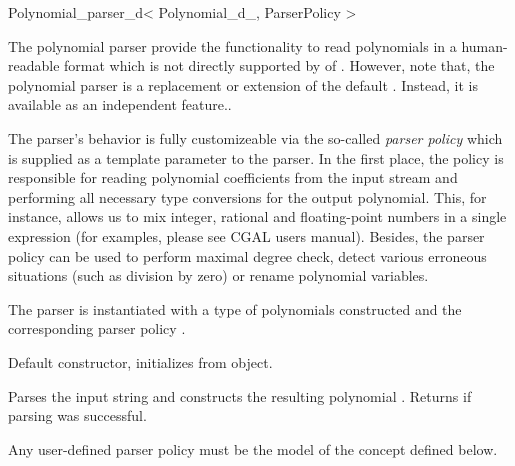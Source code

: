 % 
% 

\begin{ccRefClass}{Polynomial_parser_d< Polynomial_d_, ParserPolicy >}
\def\ccTagOperatorLayout{\ccFalse}


\ccDefinition

The polynomial parser provide the functionality to read polynomials in a human-readable format which
is not directly supported by  of . However, note that,
the polynomial parser is  a replacement or extension of the default . Instead,
it is available as an independent feature..

The parser's behavior is fully customizeable via the so-called {\em parser policy} 
which is supplied as a template parameter to the parser. 
In the first place, the policy is responsible for reading polynomial 
coefficients from the input stream and performing all necessary type conversions
for the output polynomial. This, for instance, allows us to mix integer, rational and 
floating-point numbers in a single expression (for examples, please see CGAL users manual).
Besides, the parser policy can be used to perform maximal degree check,
detect various erroneous situations (such as division by zero) 
or rename polynomial variables.

\ccParameters
The parser is instantiated with a type 
of polynomials constructed  and the corresponding parser policy . 


\ccCreation
{}

% 

{Default constructor, initializes from  object.}

\ccOperations

{Parses the input string  and constructs the resulting polynomial . 
Returns  if parsing was successful.} 

Any user-defined parser policy must be the model of the 
concept defined below.
\end{ccRefClass}

